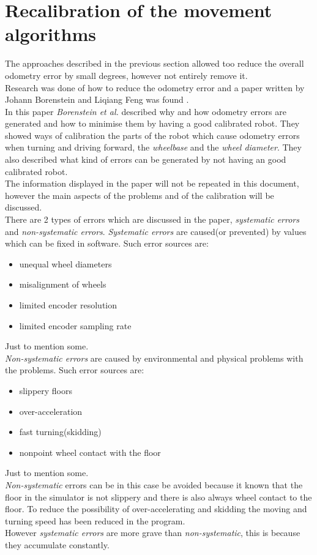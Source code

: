 \section{Recalibration of the movement algorithms}
\label{recalibration}
The approaches described in the previous section allowed too reduce the overall odometry error by small degrees, however not entirely remove it. \\
Research was done of how to reduce the odometry error and a paper written by Johann Borenstein and Liqiang Feng was found \cite{Borenstein1996Measurement}.\\

In this paper \textit{Borenstein et al.} described why and how odometry errors are generated and how to minimise them by having a good calibrated robot.
They showed ways of calibration the parts of the robot which cause odometry errors when turning and driving forward, the \textit{wheelbase} and the \textit{wheel diameter}.
They also described what kind of errors can be generated by not having an good calibrated robot.\\
The information displayed in the paper will not be repeated in this document, however the main aspects of the problems and of the calibration will be discussed.\\

There are 2 types of errors which are discussed in the paper, \textit{systematic errors} and \textit{non-systematic errors}. \textit{Systematic errors} are caused(or prevented) by values which can be fixed in software. Such error sources are: \\
\begin{itemize}
\item unequal wheel diameters
\item misalignment of wheels
\item limited encoder resolution
\item limited encoder sampling rate
\end{itemize}
Just to mention some. \\
\textit{Non-systematic errors} are caused by environmental and physical problems with the problems.
Such error sources are:\\
\begin{itemize}
\item slippery floors
\item over-acceleration
\item fast turning(skidding)
\item nonpoint wheel contact with the floor
\end{itemize}
Just to mention some.\\
\textit{Non-systematic} errors can be in this case be avoided because it known that the floor in the simulator is not slippery and there is also always wheel contact to the floor. To reduce the possibility of over-accelerating and skidding the moving and turning speed has been reduced in the program.\\
However \textit{systematic errors} are more grave than \textit{non-systematic}, this is because they accumulate constantly.\\[3ex]

